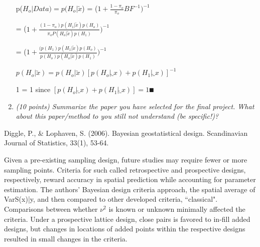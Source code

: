 \documentclass{article}\usepackage[]{graphicx}\usepackage[]{color}
\begin{document}
\begin{enumerate}
p($H_{o} | Data ) = p(H_{o} | \utilde{x}$) = ($ 1 + \frac{1-\pi_{o}}{\pi_{o}}BF^{-1})^{-1}$

= ($ 1 + \frac{(1-\pi_{o})p(H_{1}|\utilde{x})p(H_{o})}{\pi_{o}P(H_{o}|\utilde{x})p(H_{1})})^{-1}$

= ($ 1 + \frac{(p(H_{1})p(H_{1}|\utilde{x})p(H_{o})}{p(H_{o})p(H_{o}|\utilde{x})p(H_{1})})^{-1}$

\rightarrow

$p(H_{o} | \utilde{x}) = p(H_{o}|\utilde{x})[p(H_{o}|\utilde_{x}) + p(H_{1}|\utilde_{x})]^{-1}$

\rightarrow

1 = 1 since $[p(H_{o}|\utilde_{x}) + p(H_{1}|\utilde_{x})] = 1 \QED$


\item%
{\it (10 points) Summarize the paper you have selected for the final project. What about this
paper/method to you still not understand (be specific!)?}
\end{enumerate}

\begin{hangparas}{.25in}{1}
Diggle, P., & Lophaven, S. (2006). Bayesian geostatistical design. Scandinavian Journal of Statistics, 33(1), 53-64.
\end{hangparas}

Given a pre-existing sampling design, future studies may require fewer or more sampling points. Criteria for such called retrospective and prospective designs, respectively, reward accuracy in spatial prediction while accounting for parameter estimation. The authors' Bayesian design criteria approach, the spatial average of Var{S(x)|y}, and then compared to other developed criteria, ``classical". Comparisons between whether $\nu^2$ is known or unknown minimally affected the criteria. Under a prospective lattice design, close pairs is favored to in-fill added designs, but changes in locations of added points within the respective designs resulted in small changes in the criteria.
\end{document}

